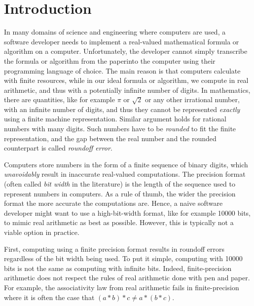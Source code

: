 
\chapter{Introduction}

\setupuuchapterbib
%
In many domains of science and engineering where computers are used, a software developer needs to implement a real-valued mathematical formula or algorithm on a computer.
%
Unfortunately, the developer cannot simply transcribe the formula or algorithm \textquotesingle\textquotesingle from the paper\textquotesingle\textquotesingle \space into the computer using their programming language of choice.
%
The main reason is that computers calculate with finite resources, while in our ideal formula or algorithm, we compute in real arithmetic, and thus with a potentially infinite number of digits.
%
In mathematics, there are quantities, like for example $\pi$ or $\sqrt{2}$ or any other irrational number, with an infinite number of digits, and thus they cannot be represented \emph{exactly} using a finite machine representation.
%
Similar argument holds for rational numbers with many digits. 
%
Such numbers have to be \emph{rounded} to fit the finite representation, and the gap between the real number and the rounded counterpart is called \emph{roundoff error}.
%

%
Computers store numbers in the form of a finite sequence of binary digits, which \emph{unavoidably} result in inaccurate real-valued computations.
%
The precision format (often called \emph{bit width} in the literature) is the length of the sequence used to represent numbers in computers.
%
As a rule of thumb, the wider the precision format the more accurate the computations are.
%
Hence, a naive software developer might want to use a high-bit-width format, like for example 10000 bits, to mimic real arithmetic as best as possible. 
%
However, this is typically not a viable option in practice.
%

First, computing using a finite precision format results in roundoff errors regardless of the bit width being used.
%
To put it simple, computing with 10000 bits is not the same as computing with infinite bits.
%
Indeed, finite-precision arithmetic does not respect the rules of real arithmetic done with \textquotesingle \textquotesingle pen and paper\textquotesingle\textquotesingle.
%
For example, the associativity law from real arithmetic fails in finite-precision where it is often the case that $(a*b)*c \ne a*(b*c)$.

